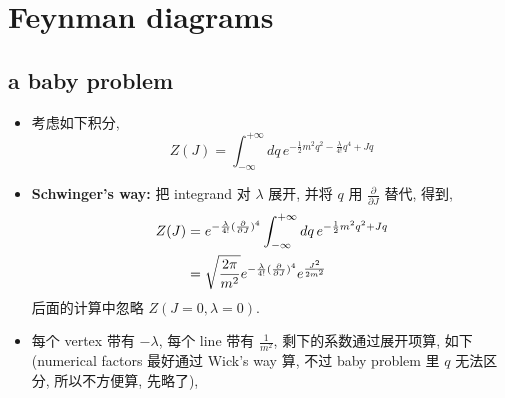 \chapter{Feynman diagrams}
\section{a baby problem}
\begin{itemize}
	\item 考虑如下积分,
	\begin{equation} \label{4.1.1}
		Z(J) = \int_{- \infty}^{+ \infty} dq \, e^{- \frac{1}{2} m^2 q^2 - \frac{\lambda}{4!} q^4 + J q}
	\end{equation}
	
	\item \textbf{Schwinger's way:} 把 integrand 对 $\lambda$ 展开, 并将 $q$ 用 $\frac{\partial}{\partial J}$ 替代, 得到,
	\begin{align}
		Z(J) &= e^{- \frac{\lambda}{4!} (\frac{\partial}{\partial J})^4} \int_{- \infty}^{+ \infty} dq \, e^{- \frac{1}{2} m^2 q^2 + J q} \notag \\
		&= \sqrt{\frac{2 \pi}{m^2}} e^{- \frac{\lambda}{4!} (\frac{\partial}{\partial J})^4} e^{\frac{J^2}{2 m^2}} \label{4.1.2}
	\end{align}
	后面的计算中忽略 $Z(J = 0, \lambda = 0)$.
	
	\item 每个 vertex 带有 $- \lambda$, 每个 line 带有 $\frac{1}{m^2}$, 剩下的系数通过展开项算, 如下 (numerical factors 最好通过 Wick's way 算, 不过 baby problem 里 $q$ 无法区分, 所以不方便算, 先略了),
	

\end{itemize}
